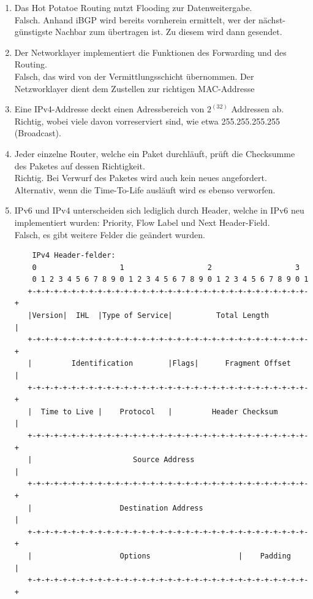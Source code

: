 \documentclass{article}
\begin{document}
\begin{enumerate}
        \item Das Hot Potatoe Routing nutzt Flooding zur Datenweitergabe.\\
        Falsch. Anhand iBGP wird bereits vornherein ermittelt, wer der nächst-günstigste Nachbar zum übertragen ist. Zu diesem wird dann gesendet.
        
        \item Der Networklayer implementiert die Funktionen des Forwarding und des Routing.\\
        Falsch, das wird von der Vermittlungsschicht übernommen. Der Netzworklayer dient dem Zustellen zur richtigen MAC-Addresse
        
        
        \item Eine IPv4-Addresse deckt einen Adressbereich von $2^(32)$ Addressen ab.\\
        Richtig, wobei viele davon vorreserviert sind, wie etwa 255.255.255.255 (Broadcast). 
        
        \item Jeder einzelne Router, welche ein Paket durchläuft, prüft die Checksumme des Paketes auf dessen Richtigkeit.\\
        Richtig. Bei Verwurf des Paketes wird auch kein neues angefordert.
        Alternativ, wenn die Time-To-Life ausläuft wird es ebenso verworfen.
        
        \item IPv6 und IPv4 unterscheiden sich lediglich durch Header, welche in IPv6 neu implementiert wurden: Priority, Flow Label und Next Header-Field.\\
        Falsch, es gibt weitere Felder die geändert wurden.
        
        \begin{verbatim}
    IPv4 Header-felder:
    0                   1                   2                   3
    0 1 2 3 4 5 6 7 8 9 0 1 2 3 4 5 6 7 8 9 0 1 2 3 4 5 6 7 8 9 0 1
   +-+-+-+-+-+-+-+-+-+-+-+-+-+-+-+-+-+-+-+-+-+-+-+-+-+-+-+-+-+-+-+-+
   |Version|  IHL  |Type of Service|          Total Length         |
   +-+-+-+-+-+-+-+-+-+-+-+-+-+-+-+-+-+-+-+-+-+-+-+-+-+-+-+-+-+-+-+-+
   |         Identification        |Flags|      Fragment Offset    |
   +-+-+-+-+-+-+-+-+-+-+-+-+-+-+-+-+-+-+-+-+-+-+-+-+-+-+-+-+-+-+-+-+
   |  Time to Live |    Protocol   |         Header Checksum       |
   +-+-+-+-+-+-+-+-+-+-+-+-+-+-+-+-+-+-+-+-+-+-+-+-+-+-+-+-+-+-+-+-+
   |                       Source Address                          |
   +-+-+-+-+-+-+-+-+-+-+-+-+-+-+-+-+-+-+-+-+-+-+-+-+-+-+-+-+-+-+-+-+
   |                    Destination Address                        |
   +-+-+-+-+-+-+-+-+-+-+-+-+-+-+-+-+-+-+-+-+-+-+-+-+-+-+-+-+-+-+-+-+
   |                    Options                    |    Padding    |
   +-+-+-+-+-+-+-+-+-+-+-+-+-+-+-+-+-+-+-+-+-+-+-+-+-+-+-+-+-+-+-+-+
        \end{verbatim}
        

\end{enumerate}
\end{document}
